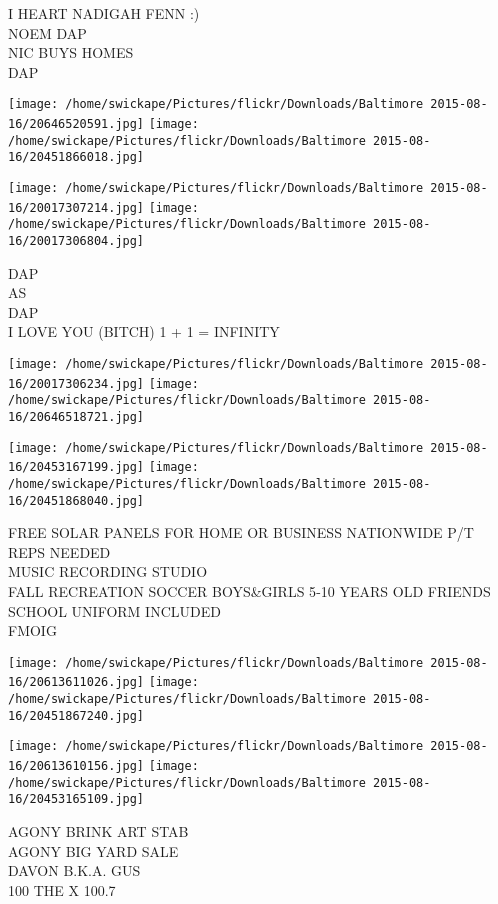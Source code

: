 \documentclass[10pt,letterpaper]{article}
\begin{document}
I HEART NADIGAH FENN :)\\
NOEM DAP\\
NIC BUYS HOMES\\
DAP
\pagebreak

\texttt{[image: /home/swickape/Pictures/flickr/Downloads/Baltimore 2015-08-16/20646520591.jpg]}
\texttt{[image: /home/swickape/Pictures/flickr/Downloads/Baltimore 2015-08-16/20451866018.jpg]}

\texttt{[image: /home/swickape/Pictures/flickr/Downloads/Baltimore 2015-08-16/20017307214.jpg]}
\texttt{[image: /home/swickape/Pictures/flickr/Downloads/Baltimore 2015-08-16/20017306804.jpg]}

DAP\\
AS\\
DAP\\
I LOVE YOU (BITCH) 1 + 1 = INFINITY
\pagebreak

\texttt{[image: /home/swickape/Pictures/flickr/Downloads/Baltimore 2015-08-16/20017306234.jpg]}
\texttt{[image: /home/swickape/Pictures/flickr/Downloads/Baltimore 2015-08-16/20646518721.jpg]}

\texttt{[image: /home/swickape/Pictures/flickr/Downloads/Baltimore 2015-08-16/20453167199.jpg]}
\texttt{[image: /home/swickape/Pictures/flickr/Downloads/Baltimore 2015-08-16/20451868040.jpg]}

FREE SOLAR PANELS FOR HOME OR BUSINESS NATIONWIDE P/T REPS NEEDED\\
MUSIC RECORDING STUDIO\\
FALL RECREATION SOCCER BOYS\&GIRLS 5{-}10 YEARS OLD FRIENDS SCHOOL UNIFORM INCLUDED\\
FMOIG
\pagebreak

\texttt{[image: /home/swickape/Pictures/flickr/Downloads/Baltimore 2015-08-16/20613611026.jpg]}
\texttt{[image: /home/swickape/Pictures/flickr/Downloads/Baltimore 2015-08-16/20451867240.jpg]}

\texttt{[image: /home/swickape/Pictures/flickr/Downloads/Baltimore 2015-08-16/20613610156.jpg]}
\texttt{[image: /home/swickape/Pictures/flickr/Downloads/Baltimore 2015-08-16/20453165109.jpg]}

AGONY BRINK ART STAB\\
AGONY BIG YARD SALE\\
DAVON B.K.A. GUS\\
100 THE X 100.7
\pagebreak
\end{document}

